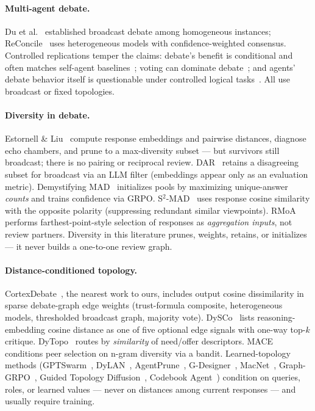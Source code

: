 \documentclass[11pt]{article}
\begin{document}
\paragraph{Multi-agent debate.}
Du et al.~\cite{du2023multiagent} established broadcast debate among homogeneous instances; ReConcile~\cite{chen2023reconcile} uses heterogeneous models with confidence-weighted consensus. Controlled replications temper the claims: debate's benefit is conditional and often matches self-agent baselines~\cite{yang2025revisiting}; voting can dominate debate~\cite{choi2025debateorvote}; and agents' debate behavior itself is questionable under controlled logical tasks~\cite{wu2025reallydebate}. All use broadcast or fixed topologies.

\paragraph{Diversity in debate.}
Estornell \& Liu~\cite{estornell2024multillm} compute response embeddings and pairwise distances, diagnose echo chambers, and prune to a max-diversity subset — but survivors still broadcast; there is no pairing or reciprocal review. DAR~\cite{nguyen2026dars} retains a disagreeing subset for broadcast via an LLM filter (embeddings appear only as an evaluation metric). Demystifying MAD~\cite{zhu2026demystifying} initializes pools by maximizing unique-answer \emph{counts} and trains confidence via GRPO. S$^2$-MAD~\cite{zeng2025s2mad} uses response cosine similarity with the opposite polarity (suppressing redundant similar viewpoints). RMoA~\cite{rmoa2025} performs farthest-point-style selection of responses as \emph{aggregation inputs}, not review partners. Diversity in this literature prunes, weights, retains, or initializes — it never builds a one-to-one review graph.

\paragraph{Distance-conditioned topology.}
CortexDebate~\cite{cortexdebate2025}, the nearest work to ours, includes output cosine dissimilarity in sparse debate-graph edge weights (trust-formula composite, heterogeneous models, thresholded broadcast graph, majority vote). DySCo~\cite{dysco2026} lists reasoning-embedding cosine distance as one of five optional edge signals with one-way top-$k$ critique. DyTopo~\cite{dytopo2026} routes by \emph{similarity} of need/offer descriptors. MACE~\cite{mace2026} conditions peer selection on n-gram diversity via a bandit. Learned-topology methods (GPTSwarm~\cite{gptswarm}, DyLAN~\cite{dylan}, AgentPrune~\cite{agentprune}, G-Designer~\cite{gdesigner}, MacNet~\cite{macnet}, Graph-GRPO~\cite{graphgrpo}, Guided Topology Diffusion~\cite{gtd2025}, Codebook Agent~\cite{codebookagent}) condition on queries, roles, or learned values — never on distances among current responses — and usually require training.
\end{document}
